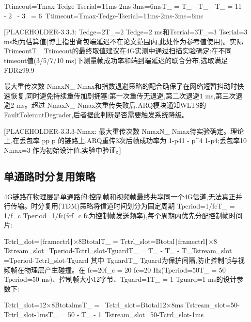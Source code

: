 Ttimeout=Tmax⁡-Tedge-Tserial=11ms-2ms-3ms=6msT_{} = T_{\max} - T_{} - T_{}
= 11\  - 2\  - 3\  = 6\ Ttimeout​=Tmax​-Tedge​-Tserial​=11ms-2ms-3ms=6ms

[PLACEHOLDER-3.3.3: Tedge=2T_{}=2
Tedge​=2 ms和Tserial=3T_{}=3
Tserial​=3 ms均为估算值(博士指出背包端延迟不在论文范围内,此处作为参考值使用)。实际 TtimeoutT_{}
Ttimeout的最终取值建议在4G实测中通过扫描实验确定:在不同timeout值(3/5/7/10 ms)下测量帧成功率和端到端延迟的联合分布,选取满足FDR≥99.9%


最大重传次数 Nmax⁡N_{\max}
Nmax和指数退避策略的配合确保了在网络短暂抖动时快速恢复,同时避免持续重传加剧拥塞:第一次重传无退避,第二次退避1 ms,第三次退避2 ms。超过 Nmax⁡N_{\max}
Nmax次重传失败后,ARQ模块通知WLTS的FaultTolerantDegrader,后者据此判断是否需要触发系统降级。


[PLACEHOLDER-3.3.3-Nmax: 最大重传次数 Nmax⁡N_{\max}
Nmax待实验确定。理论上,在丢包率 pp
p 的链路上,ARQ重传3次后帧成功率为 1-p41 - p^4
1-p4;丢包率10%
Nmax​=3 作为初始设计值,实验中验证。]


\subsection{单通路时分复用策略}

4G链路在物理层是单通路的:控制帧和视频帧最终共享同一个4G信道,无法真正并行传输。时分复用(TDM)策略将信道时间划分为固定周期 Tperiod=1/fcT_{} = 1/f_c
Tperiod​=1/fc​(fcf_c
fc为控制帧发送频率),每个周期内优先分配控制帧时间片:

Tctrl_slot=∣framectrl∣×8BtotalT_{} = Tctrl_slot​=Btotal​∣framectrl​∣×8​
Tstream_slot=Tperiod-Tctrl_slot-TguardT_{} = T_{} - T_{} - T_{}Tstream_slot​=Tperiod​-Tctrl_slot​-Tguard​
其中 TguardT_{}
Tguard为保护间隔,防止控制帧与视频帧在物理层产生碰撞。在 fc=20f_c = 20
fc​=20 Hz(Tperiod=50T_{} = 50
Tperiod​=50 ms)、控制帧大小12字节、Tguard=1T_{} = 1
Tguard​=1 ms的设计参数下:

Tctrl_slot=12×8BtotalmsT_{} = \ Tctrl_slot​=Btotal​12×8​ms
Tstream_slot=50-Tctrl_slot-1msT_{} = 50 - T_{} - 1\ Tstream_slot​=50-Tctrl_slot​-1ms

